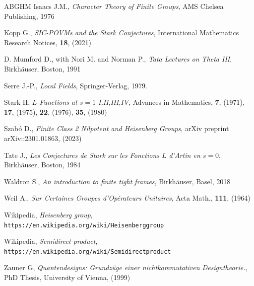 \documentclass[12pt]{article}
\begin{document}
\begin{thebibliography}{ABGHM}
Isaacs J.M., \textit{Character Theory of Finite Groups},
AMS Chelsea Publishing, 1976


Kopp G., 
\textit{SIC-POVMs and the Stark Conjectures},
International Mathematics Research Notices,
{\bf 18}, 
(2021)

D. Mumford D., with Nori M. and Norman P., 
\textit{Tata Lectures on Theta III},
Birkh\"auser, 
Boston, 1991

 Serre J.-P., {\em Local Fields}, Springer-Verlag,
1979.

Stark H, 
\textit{$L$-Functions at $s=1$ I,II,III,IV}, 
Advances in
Mathematics, 
{\bf 7}, (1971), 
{\bf 17}, (1975),
{\bf 22}, (1976), 
{\bf 35}, (1980)

Szab\'o D., 
\textit{Finite Class 2 Nilpotent and Heisenberg Groups},
arXiv preprint arXiv::2301.01863, 
(2023)



Tate J., 
{\em Les Conjectures de Stark sur les Fonctions $L$ d'Artin en $s=0$}, Birkh\"{a}user, 
Boston, 
1984


Waldron S., 
\textit{An introduction to finite tight frames}, 
Birkhäuser, Basel, 2018

Weil A., 
\textit{Sur Certaines Groupes d'Op\'erateurs Unitaires},
Acta Math.,
{\bf 111}, 
(1964)

Wikipedia, 
\textit{Heisenberg group},
{\tt https://en.wikipedia.org/wiki/Heisenberg\textunderscore group}

 
Wikipedia, 
\textit{Semidirect product},
{\tt https://en.wikipedia.org/wiki/Semidirect\textunderscore product}


Zauner G, 
\textit{Quantendesigns: Grundz\"uge einer nichtkommutativen Designtheorie.},
PhD Thesis, University of Vienna, (1999)













\end{thebibliography}
\end{document}
